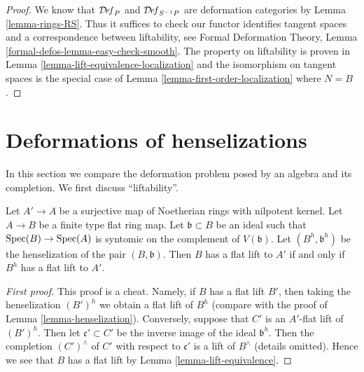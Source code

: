 \begin{proof}
We know that $\mathcal{D}\!\mathit{ef}_P$ and $\mathcal{D}\!\mathit{ef}_{S^{-1}P}$
are deformation categories by Lemma \ref{lemma-rings-RS}.
Thus it suffices to check
our functor identifies tangent spaces and a correspondence
between liftability, see
Formal Deformation Theory, Lemma \ref{formal-defos-lemma-easy-check-smooth}.
The property on liftability is proven in
Lemma \ref{lemma-lift-equivalence-localization}
and the isomorphism on tangent spaces is the special case of
Lemma \ref{lemma-first-order-localization} where $N = B$.
\end{proof}



\section{Deformations of henselizations}
\label{section-compare-henselization}

\noindent
In this section we compare the deformation problem posed
by an algebra and its completion.
We first discuss ``liftability''.

\begin{lemma}
\label{lemma-lift-equivalence-henselization}
Let $A' \to A$ be a surjective map of Noetherian rings with nilpotent kernel.
Let $A \to B$ be a finite type flat ring map.
Let $\mathfrak b \subset B$ be an ideal such that
$\mathop{\mathrm{Spec}}(B) \to \mathop{\mathrm{Spec}}(A)$ is syntomic on the complement of $V(\mathfrak b)$.
Let $(B^h, \mathfrak b^h)$ be the henselization of the pair $(B, \mathfrak b)$.
Then $B$ has a flat lift to $A'$ if and only if $B^h$ has a flat lift to $A'$.
\end{lemma}

\begin{proof}[First proof]
This proof is a cheat. Namely, if $B$ has a flat lift $B'$, then
taking the henselization $(B')^h$ we obtain a flat lift of $B^h$
(compare with the proof of Lemma \ref{lemma-henselization}).
Conversely, suppose that $C'$ is an $A'$-flat lift of $(B')^h$.
Then let $\mathfrak c' \subset C'$ be the inverse image of the
ideal $\mathfrak b^h$. Then the completion $(C')^\wedge$ of
$C'$ with respect to $\mathfrak c'$ is a lift of $B^\wedge$ (details omitted).
Hence we see that $B$ has a flat lift by
Lemma \ref{lemma-lift-equivalence}.
\end{proof}

